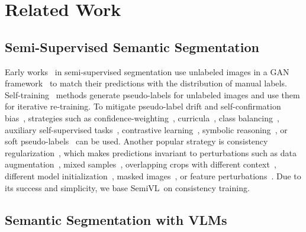 \documentclass[10pt,twocolumn,letterpaper]{article}
\newcommand{\ours}{SemiVL}
\begin{document}
 \section{Related Work}

\subsection{Semi-Supervised Semantic Segmentation}

Early works~\cite{souly2017semi,mittal2019semi} in semi-supervised segmentation use unlabeled images in a GAN framework~\cite{goodfellow2014generative} to match their predictions with the distribution of manual labels. Self-training~\cite{grandvalet2004semi, lee2013pseudo} methods generate pseudo-labels for unlabeled images and use them for iterative re-training. To mitigate pseudo-label drift and self-confirmation bias~\cite{arazo2020pseudo}, strategies such as confidence-weighting~\cite{feng2022dmt, yang2022st++},  curricula~\cite{zhang2021flexmatch, xu2021dash, ma2023enhanced}, class balancing~\cite{he2021re, hu2021semi, guan2022unbiased, hoyer2022daformer}, auxiliary self-supervised tasks~\cite{hoyer2021three,hoyer2023improving}, contrastive learning~\cite{wang2022semi}, 
symbolic reasoning~\cite{liang2023logic}, 
or soft pseudo-labels~\cite{ma2023enhanced} can be used. Another popular strategy is consistency regularization~\cite{bachman2014learning,sajjadi2016regularization}, which makes predictions invariant to perturbations such as data augmentation~\cite{sohn2020fixmatch,yang2022st++,yang2023revisiting}, mixed samples~\cite{french2019semi,hu2021semi,olsson2021classmix}, overlapping crops with different context~\cite{lai2021semi,hoyer2022hrda,hoyer2023domain}, different model initialization~\cite{chen2021semi}, masked images~\cite{hoyer2023mic}, or feature perturbations~\cite{yang2023revisiting}. Due to its success and simplicity, we base \ours\ on consistency training.

\subsection{Semantic Segmentation with VLMs}
\label{ref:related_clip_segmentation}
\end{document}
